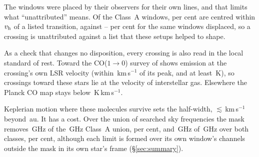 The windows were placed by their observers for their own lines, and that
limits what ``unattributed'' means. Of the Class~A windows, \TnCenPct{} per
cent are centred within $v_{\rm h}$ of a listed transition, against
\TnCtrlCenLo--\TnCtrlCenHi{} per cent for the same windows displaced, so a
crossing is unattributed against a list that these setups helped to shape.

As a check that changes no disposition, every crossing is also read in the
local standard of rest. Toward
\LsCloudStars{} the CO($1\to0$) survey of \citet{DameThaddeus2022,Dame2001}
shows emission at the crossing's own LSR velocity (within
\LsCloudDvMax\,km\,s$^{-1}$ of its peak, and at least \LsCloudTMin\,K), so
\LsNCloud{} crossings toward these stars lie at the velocity of
interstellar gas. Elsewhere the Planck CO
map \citep{PlanckCO2016} stays below
\LsPlanckMax\,K\,km\,s$^{-1}$.

Keplerian motion where these molecules survive sets the half-width,
$\lesssim$\EcKepVKms\,km\,s$^{-1}$ beyond \EcKepRAu\,au. It has a cost.
Over the union of searched sky frequencies the mask removes \MkMaskAGHz\,GHz
of the \CvUnionA\,GHz Class~A union, \MkMaskAPct{} per cent, and
\FrMaskLostGHz\,GHz of \FrMaskUnionGHz\,GHz over both classes, \FrMaskPct{}
per cent, although each limit is formed over its own window's channels
outside the mask in its own star's frame (\S\ref{sec:summary}).

\begin{table}
\centering
\footnotesize
\caption{The line mask, by species: the number $N$ of transitions, the
frequency range they span inside the searched intervals and their
upper-state energies.}
\label{tab:masklines}

\end{table}
